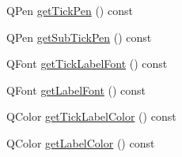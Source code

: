 \begin{DoxyCompactItemize}
\item 
Q\+Pen \hyperlink{classQCPAxis_a7f503910be40fb1717e1635be3ef17e1}{get\+Tick\+Pen} () const 
\item 
Q\+Pen \hyperlink{classQCPAxis_ab4f7e60a40eb051c775afcaeab895c85}{get\+Sub\+Tick\+Pen} () const 
\item 
Q\+Font \hyperlink{classQCPAxis_aef30b66668986523225089a67280ec7a}{get\+Tick\+Label\+Font} () const 
\item 
Q\+Font \hyperlink{classQCPAxis_ab0768eb2879efb202645d19ff789e63e}{get\+Label\+Font} () const 
\item 
Q\+Color \hyperlink{classQCPAxis_a0f8583f7ac24ccc70d39fdd2389cad6e}{get\+Tick\+Label\+Color} () const 
\item 
Q\+Color \hyperlink{classQCPAxis_a42bd69b9e9c571f13624079be18ccdc1}{get\+Label\+Color} () const 
\end{DoxyCompactItemize}
